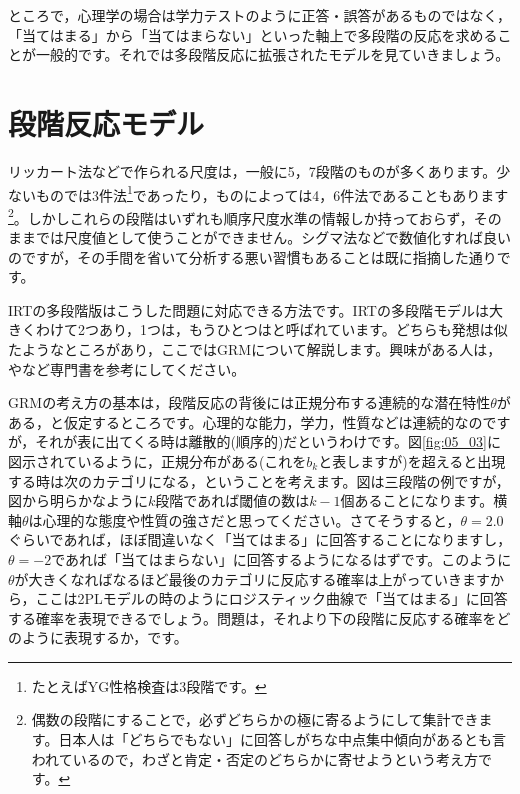 \documentclass{ltjsbook}
\begin{document}
ところで，心理学の場合は学力テストのように正答・誤答があるものではなく，「当てはまる」から「当てはまらない」といった軸上で多段階の反応を求めることが一般的です。それでは多段階反応に拡張されたモデルを見ていきましょう。
\section{段階反応モデル}
リッカート法などで作られる尺度は，一般に5，7段階のものが多くあります。少ないものでは3件法\footnote{たとえばYG性格検査は3段階です。}であったり，ものによっては4，6件法であることもあります\footnote{偶数の段階にすることで，必ずどちらかの極に寄るようにして集計できます。日本人は「どちらでもない」に回答しがちな中点集中傾向があるとも言われているので，わざと肯定・否定のどちらかに寄せようという考え方です。}。しかしこれらの段階はいずれも順序尺度水準の情報しか持っておらず，そのままでは尺度値として使うことができません。シグマ法などで数値化すれば良いのですが，その手間を省いて分析する悪い習慣もあることは既に指摘した通りです。

IRTの多段階版はこうした問題に対応できる方法です。IRTの多段階モデルは大きくわけて2つあり，1つは\parencite{samejima1997graded}，もうひとつは\parencite{muraki1992generalized}と呼ばれています。どちらも発想は似たようなところがあり，ここではGRMについて解説します。興味がある人は，\textcite{Toyoda20120824}や\textcite{Katoken2014}など専門書を参考にしてください。

GRMの考え方の基本は，段階反応の背後には正規分布する連続的な潜在特性$\theta$がある，と仮定するところです。心理的な能力，学力，性質などは連続的なのですが，それが表に出てくる時は離散的(順序的)だというわけです。図\ref{fig:05_03}に図示されているように，正規分布がある(これを$b_k$と表しますが)を超えると出現する時は次のカテゴリになる，ということを考えます。図は三段階の例ですが，図から明らかなように$k$段階であれば閾値の数は$k-1$個あることになります。横軸$\theta$は心理的な態度や性質の強さだと思ってください。さてそうすると，$\theta=2.0$ぐらいであれば，ほぼ間違いなく「当てはまる」に回答することになりますし，$\theta=-2$であれば「当てはまらない」に回答するようになるはずです。このように$\theta$が大きくなればなるほど最後のカテゴリに反応する確率は上がっていきますから，ここは2PLモデルの時のようにロジスティック曲線で「当てはまる」に回答する確率を表現できるでしょう。問題は，それより下の段階に反応する確率をどのように表現するか，です。
\end{document}
